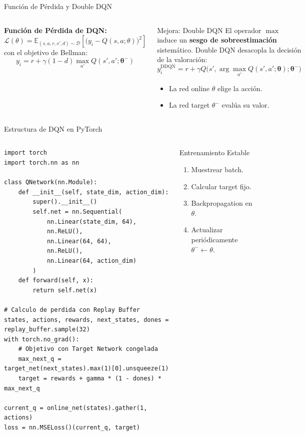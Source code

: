 \begin{frame}{Función de Pérdida y Double DQN}
  \begin{columns}[c,onlytextwidth]
      \textbf{Función de Pérdida de DQN:}
      \[
        \mathcal{L}(\theta) = \mathbb{E}_{(s,a,r,s',d) \sim \mathcal{D}} \left[ \Big( y_i - Q(s,a;\theta) \Big)^2 \right]
      \]
      con el objetivo de Bellman:
      \[
        y_i = r + \gamma (1 - d) \max_{a'} Q(s', a'; \mathbf{\theta^-})
      \]
      \begin{exampleblock}{Mejora: Double DQN}
        El operador $\max$ induce un \textbf{sesgo de sobreestimación} sistemático. Double DQN desacopla la decisión de la valoración:
        \[
          y_i^{\text{DDQN}} = r + \gamma Q\Big( s', \arg\max_{a'} Q(s', a'; \mathbf{\theta}); \mathbf{\theta^-} \Big)
        \]
        \begin{itemize}
          \item La red online $\theta$ elige la acción.
          \item La red target $\theta^-$ evalúa su valor.
        \end{itemize}
      \end{exampleblock}
  \end{columns}
\end{frame}

\begin{frame}[fragile]{Estructura de DQN en PyTorch}
  \begin{columns}[T,onlytextwidth]
\begin{lstlisting}[style=rlcode]
import torch
import torch.nn as nn

class QNetwork(nn.Module):
    def __init__(self, state_dim, action_dim):
        super().__init__()
        self.net = nn.Sequential(
            nn.Linear(state_dim, 64),
            nn.ReLU(),
            nn.Linear(64, 64),
            nn.ReLU(),
            nn.Linear(64, action_dim)
        )
    def forward(self, x):
        return self.net(x)

# Calculo de perdida con Replay Buffer
states, actions, rewards, next_states, dones = replay_buffer.sample(32)
with torch.no_grad():
    # Objetivo con Target Network congelada
    max_next_q = target_net(next_states).max(1)[0].unsqueeze(1)
    target = rewards + gamma * (1 - dones) * max_next_q

current_q = online_net(states).gather(1, actions)
loss = nn.MSELoss()(current_q, target)
\end{lstlisting}
      \begin{block}{Entrenamiento Estable}
        \begin{enumerate}
          \item Muestrear batch.
          \item Calcular target fijo.
          \item Backpropagation en $\theta$.
          \item Actualizar periódicamente $\theta^- \leftarrow \theta$.
        \end{enumerate}
      \end{block}
  \end{columns}
\end{frame}
